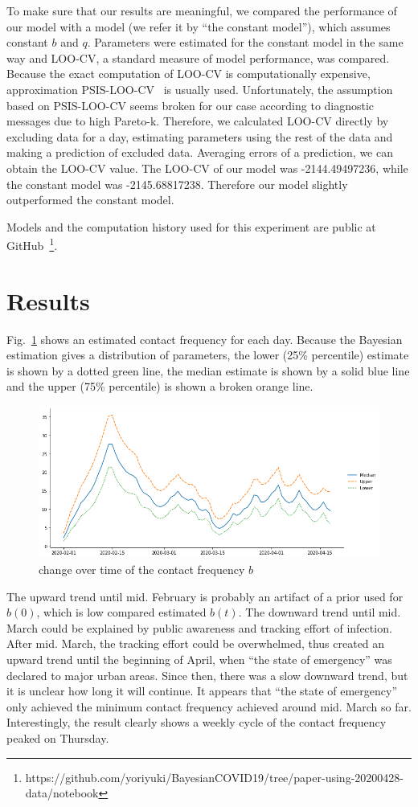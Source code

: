 \documentclass{amsart}
\begin{document}
To make sure that our results are meaningful, we compared the performance of our model with a model (we refer it by ``the constant model''), which assumes constant $b$ and $q$.
Parameters were estimated for the constant model in the same way and LOO-CV, a standard measure of model performance, was compared.
Because the exact computation of LOO-CV is computationally expensive, approximation PSIS-LOO-CV~\cite{Vehtari2017} is usually used.
Unfortunately, the assumption based on PSIS-LOO-CV seems broken for our case according to diagnostic messages due to high Pareto-k.
Therefore, we calculated LOO-CV directly by excluding data for a day, estimating parameters using the rest of the data and making a prediction of excluded data.
Averaging errors of a prediction, we can obtain the LOO-CV value.
The LOO-CV of our model was -2144.49497236, while the constant model was -2145.68817238. Therefore our model slightly outperformed the constant model.

Models and the computation history used for this experiment are public at GitHub~\footnote{https://github.com/yoriyuki/BayesianCOVID19/tree/paper-using-20200428-data/notebook}.

\section{Results}

Fig.~\ref{fig:b} shows an estimated contact frequency for each day.
Because the Bayesian estimation gives a distribution of parameters, the lower (25\% percentile) estimate is shown by a dotted green line, the median estimate is shown by a solid blue line and the upper (75\% percentile) is shown a broken orange line.
\begin{figure}[h]
 \centering
 \includegraphics[width=\linewidth]{fig/b-Japan.png}
 \caption{ change over time of the contact frequency $b$}
 \label{fig:b}
\end{figure}
The upward trend until mid. February is probably an artifact of a prior used for $b(0)$, which is low compared estimated $b(t)$.
The downward trend until mid. March could be explained by public awareness and tracking effort of infection.
After mid. March, the tracking effort could be overwhelmed, thus created an upward trend until the beginning of April, when ``the state of emergency'' was declared to major urban areas.
Since then, there was a slow downward trend, but it is unclear how long it will continue.
It appears that ``the state of emergency'' only achieved the minimum contact frequency achieved around mid. March so far.
Interestingly, the result clearly shows a weekly cycle of the contact frequency peaked on Thursday.
\end{document}
